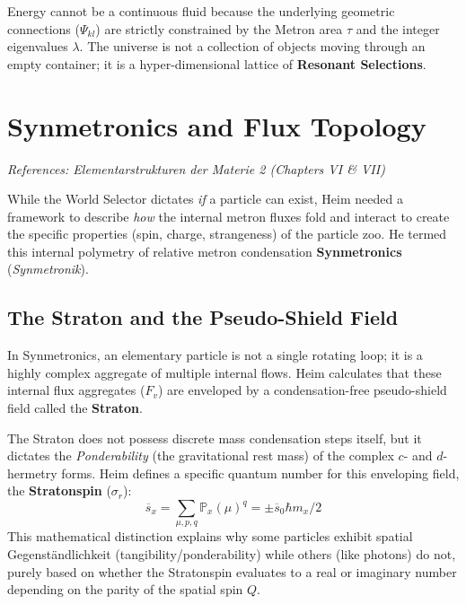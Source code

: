 \documentclass[11pt,a4paper,oneside]{article}
\begin{document}
Energy cannot be a continuous fluid because the underlying geometric connections ($\Psi_{kl}$) are strictly constrained by the Metron area $\tau$ and the integer eigenvalues $\lambda$. The universe is not a collection of objects moving through an empty container; it is a hyper-dimensional lattice of \textbf{Resonant Selections}. 
\section{Synmetronics and Flux Topology}
\label{sec:synmetronics}
\textit{References: Elementarstrukturen der Materie 2 (Chapters VI \& VII)}

While the World Selector dictates \textit{if} a particle can exist, Heim needed a framework to describe \textit{how} the internal metron fluxes fold and interact to create the specific properties (spin, charge, strangeness) of the particle zoo. He termed this internal polymetry of relative metron condensation \textbf{Synmetronics} (\textit{Synmetronik}).

\subsection{The Straton and the Pseudo-Shield Field}
In Synmetronics, an elementary particle is not a single rotating loop; it is a highly complex aggregate of multiple internal flows. Heim calculates that these internal flux aggregates ($F_v$) are enveloped by a condensation-free pseudo-shield field called the \textbf{Straton}. 

The Straton does not possess discrete mass condensation steps itself, but it dictates the \textit{Ponderability} (the gravitational rest mass) of the complex $c$- and $d$-hermetry forms. Heim defines a specific quantum number for this enveloping field, the \textbf{Stratonspin} ($\sigma_r$):
\begin{equation}
    \overline{s}_x = \sum_{\mu, p, q} \mathbb{P}_x(\mu)^q = \pm \overline{s}_0 \hbar m_x / 2
\end{equation}
This mathematical distinction explains why some particles exhibit spatial Gegenständlichkeit (tangibility/ponderability) while others (like photons) do not, purely based on whether the Stratonspin evaluates to a real or imaginary number depending on the parity of the spatial spin $Q$.
\end{document}
